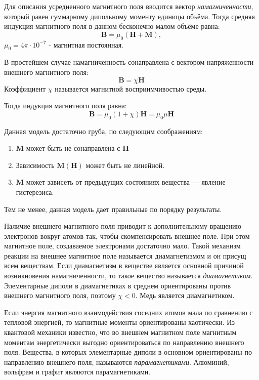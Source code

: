 \documentclass[12pt,a4paper]{article}
\begin{document}
	Для описания усредненного магнитного поля вводится вектор \textit{намагниченности}, который равен суммарному дипольному моменту единицы объёма. Тогда средняя индукция магнитного поля в данном бесконечно малом объёме равна:
	$$
	\boldsymbol{B} = \mu_0 (\boldsymbol{H} + \boldsymbol{M}),
	$$
	$\mu_0 = 4 \pi \cdot 10^{-7}$ - магнитная постоянная.
	
	В простейшем случае намагниченность сонаправлена с вектором напряженности внешнего магнитного поля:
	$$
	\boldsymbol{B} = \chi \boldsymbol{H}
	$$
	Коэффициент $\chi$ называется магнитной восприимчивостью среды.
	
	Тогда индукция магнитного поля равна:
	$$
	\boldsymbol{B} =  \mu_0 (1 + \chi) \boldsymbol{H} = \mu_0 \mu \boldsymbol{H}
	$$
	
	Данная модель достаточно груба, по следующим соображениям:
	\begin{enumerate}
		\item $\boldsymbol{M}$ может быть не сонаправлена с $\boldsymbol{H}$
		
		\item Зависимость $\boldsymbol{M}(\boldsymbol{H})$ может быть не линейной.
		
		\item $\boldsymbol{M}$ может зависеть от предыдущих состояниях вещества --- явление гистерезиса.
	\end{enumerate}
	Тем не менее, данная модель дает правильные по порядку результаты.
	
	Наличие внешнего магнитного поля приводит к дополнительному вращению электронов вокруг атомов так, чтобы скомпенсировать внешнее поле. При этом магнитное поле, создаваемое электронами достаточно мало. Такой механизм реакции на внешнее магнитное поле называется диамагнетизмом и он присущ всем веществам. Если диамагнетизм в веществе является основной причиной возникновения намагниченности, то такое вещество называется \textit{диамагнетиком}. Элементарные диполи в диамагнетиках в среднем ориентированы против внешнего магнитного поля, поэтому $\chi < 0$. Медь является диамагнетиком.
	
	Если энергия магнитного взаимодействия соседних атомов мала по сравнению с тепловой энергией, то магнитные моменты ориентированы хаотически. Из квантовой механики известно, что во внешнем магнитном поле магнитным моментам энергетически выгодно ориентироваться по направлению внешнего поля. Вещества, в которых элементарные диполи в основном ориентированы по направлению внешнего поля, называются \textit{парамагнетиками}. Алюминий, вольфрам и графит являются парамагнетиками.
	
\end{document}
